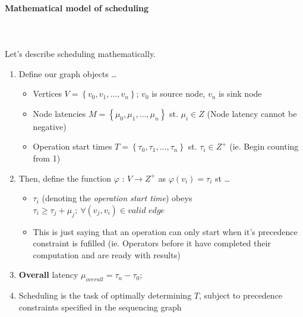 \documentclass{article}
\begin{document}
\paragraph{Mathematical model of scheduling}\mbox{}\\\\
Let's describe scheduling mathematically.

\begin{enumerate}
    \item 
    Define our graph objects \dots
    \begin{itemize}
        \item Vertices $V = \left\{ v_{0}, v_{1}, \dots, v_{n} \right\}$; $v_{0}$ is source node, $v_{n}$ is sink node
        \item Node latencies $M = \left\{ \mu_{0}, \mu_{1}, \dots, \mu_{n} \right\}$ st. $\mu_{i}\in Z$ (Node latency cannot be negative)
        \item Operation start times $T = \left\{ \tau_{0}, \tau_{1}, \dots, \tau_{n} \right\}$ st. $\tau_{i}\in Z^{+}$ (ie. Begin counting from 1)
    \end{itemize}
    \item Then, define the function $\varphi$ : $V \xrightarrow{} Z^{+}$ as $\varphi(v_{i}) = \tau_{i}$ st \dots
        \begin{itemize}
            \item $\tau_{i}$ (denoting the \textit{operation start time}) obeys $\tau_{i} \ge \tau_{j} + \mu_{j}; \ \forall (v_{j},v_{i}) \in \textit{valid edge} $
            \item This is just saying that an operation can only start when it's precedence constraint is fufilled (ie. Operators before it have completed their computation and are ready with results)
        \end{itemize}
    \item \textbf{Overall} latency $\mu_{overall} = \tau_{n} - \tau_{0}$;
    \item Scheduling is the task of optimally determining $T$, subject to precedence constraints specified in the sequencing graph
\end{enumerate}

\newpage
\end{document}
